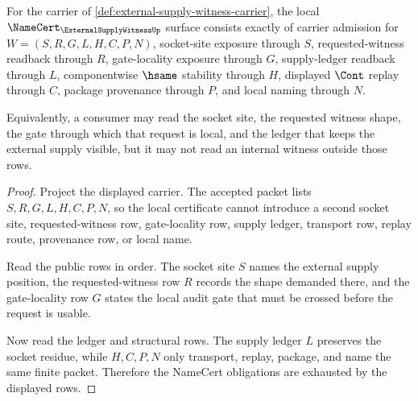 \begin{theorem}
\label{thm:external-supply-witness-namecert-obligations}
For the carrier of \autoref{def:external-supply-witness-carrier}, the local $\NameCert_{\ExternalSupplyWitnessUp}$ surface consists exactly of carrier admission for $W=(S,R,G,L,H,C,P,N)$, socket-site exposure through $S$, requested-witness readback through $R$, gate-locality exposure through $G$, supply-ledger readback through $L$, componentwise $\hsame$ stability through $H$, displayed $\Cont$ replay through $C$, package provenance through $P$, and local naming through $N$.

Equivalently, a consumer may read the socket site, the requested witness shape, the gate through which that request is local, and the ledger that keeps the external supply visible, but it may not read an internal witness outside those rows.
\end{theorem}
\begin{proof}
Project the displayed carrier. The accepted packet lists $S,R,G,L,H,C,P,N$, so the local certificate cannot introduce a second socket site, requested-witness row, gate-locality row, supply ledger, transport row, replay route, provenance row, or local name.

Read the public rows in order. The socket site $S$ names the external supply position, the requested-witness row $R$ records the shape demanded there, and the gate-locality row $G$ states the local audit gate that must be crossed before the request is usable.

Now read the ledger and structural rows. The supply ledger $L$ preserves the socket residue, while $H,C,P,N$ only transport, replay, package, and name the same finite packet. Therefore the NameCert obligations are exhausted by the displayed rows.
\end{proof}

